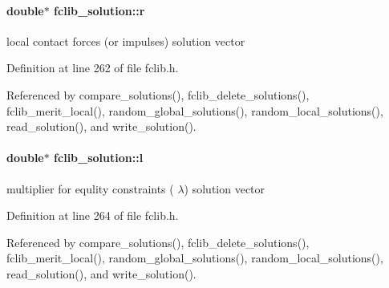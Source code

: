 \hypertarget{structfclib__solution_aba0437aebbb1060350ef2f0a6e8b504d}{}
\paragraph[{r}]{\setlength{\rightskip}{0pt plus 5cm}double$\ast$ fclib\+\_\+solution\+::r}\label{structfclib__solution_aba0437aebbb1060350ef2f0a6e8b504d}


local contact forces (or impulses) solution vector 



Definition at line 262 of file fclib.\+h.



Referenced by compare\+\_\+solutions(), fclib\+\_\+delete\+\_\+solutions(), fclib\+\_\+merit\+\_\+local(), random\+\_\+global\+\_\+solutions(), random\+\_\+local\+\_\+solutions(), read\+\_\+solution(), and write\+\_\+solution().

\hypertarget{structfclib__solution_a872a687856540dd19286aec43d890ede}{}
\paragraph[{l}]{\setlength{\rightskip}{0pt plus 5cm}double$\ast$ fclib\+\_\+solution\+::l}\label{structfclib__solution_a872a687856540dd19286aec43d890ede}


multiplier for equlity constraints ( $\lambda$) solution vector 



Definition at line 264 of file fclib.\+h.



Referenced by compare\+\_\+solutions(), fclib\+\_\+delete\+\_\+solutions(), fclib\+\_\+merit\+\_\+local(), random\+\_\+global\+\_\+solutions(), random\+\_\+local\+\_\+solutions(), read\+\_\+solution(), and write\+\_\+solution().

